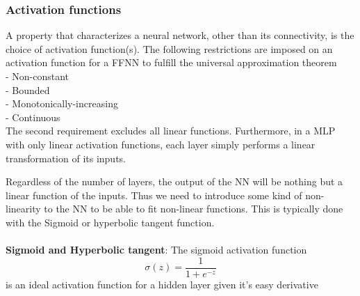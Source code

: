 \subsubsection{Activation functions}
%
A property that characterizes a neural network, other than its connectivity, is
the choice of activation function(s). 
The following restrictions are imposed on an activation function for a FFNN to
fulfill the universal approximation theorem\\
- Non-constant \\
- Bounded \\
- Monotonically-increasing \\
- Continuous \\

The second requirement excludes all linear functions. Furthermore, in a MLP
with only linear activation functions, each layer simply performs a linear
transformation of its inputs.

Regardless of the number of layers, the output of the NN will be nothing but a
linear function of the inputs. Thus we need to introduce some kind of
non-linearity to the NN to be able to fit non-linear functions. This is
typically done with the Sigmoid or hyperbolic tangent function.
\\~\\
\textbf{Sigmoid and Hyperbolic tangent}:
The sigmoid activation function
\begin{equation*}
    \label{eq:sigmoid} 
    \sigma(z) = \frac{1}{1+e^{-z}}
\end{equation*}
is an ideal activation function for a hidden layer given it's easy derivative

